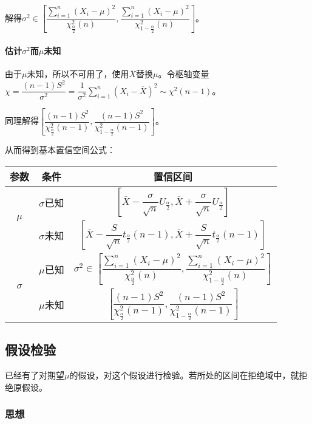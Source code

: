 解得$\sigma^2\in\left[\dfrac{\sum\limits_{i=1}^n(X_i-\mu)^2}{\chi^2_\frac{\alpha}{2}(n)},\dfrac{\sum\limits_{i=1}^n(X_i-\mu)^2}{\chi^2_{1-\frac{\alpha}{2}}(n)}\right]$。

\paragraph{\texorpdfstring{估计$\sigma^2$而$\mu$未知}{}} \leavevmode \medskip

由于$\mu$未知，所以不可用了，使用$\overline{X}$替换$\mu$。令枢轴变量$\chi=\dfrac{(n-1)S^2}{\sigma^2}=\dfrac{1}{\sigma^2}\sum\limits_{i=1}^n(X_i-\overline{X})^2\sim\chi^2(n-1)$。

同理解得$\left[\dfrac{(n-1)S^2}{\chi^2_{\frac{\alpha}{2}}(n-1)},\dfrac{(n-1)S^2}{\chi^2_{1-\frac{\alpha}{2}}(n-1)}\right]$。\medskip

从而得到基本置信空间公式：

\begin{tabular}{|c|c|c|}
    \hline
    参数 & 条件 & 置信区间 \\ \hline
    \multirow{2}{*}{$\mu$} & $\sigma$已知 & $\left[\overline{X}-\dfrac{\sigma}{\sqrt{n}}U_{\frac{\alpha}{2}},\overline{X}+\dfrac{\sigma}{\sqrt{n}}U_{\frac{\alpha}{2}}\right]$ \\ \cline{2-3}
    & $\sigma$未知 & $\left[\overline{X}-\dfrac{S}{\sqrt{n}}t_{\frac{\alpha}{2}}(n-1),\overline{X}+\dfrac{S}{\sqrt{n}}t_{\frac{\alpha}{2}}(n-1)\right]$ \\ \hline
    \multirow{2}{*}{$\sigma$} & $\mu$已知 & $\sigma^2\in\left[\dfrac{\sum\limits_{i=1}^n(X_i-\mu)^2}{\chi^2_\frac{\alpha}{2}(n)},\dfrac{\sum\limits_{i=1}^n(X_i-\mu)^2}{\chi^2_{1-\frac{\alpha}{2}}(n)}\right]$ \\ \cline{2-3}
    & $\mu$未知 & $\left[\dfrac{(n-1)S^2}{\chi^2_{\frac{\alpha}{2}}(n-1)},\dfrac{(n-1)S^2}{\chi^2_{1-\frac{\alpha}{2}}(n-1)}\right]$ \\ \hline
\end{tabular}

\subsection{假设检验}

已经有了对期望$\mu$的假设，对这个假设进行检验。若所处的区间在拒绝域中，就拒绝原假设。

\subsubsection{思想}

